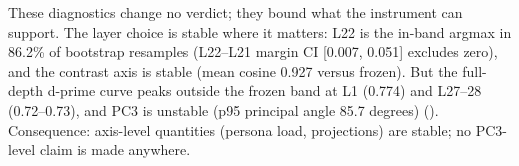 These diagnostics change no verdict; they bound what the instrument can
support. The layer choice is stable where it matters: L22 is the in-band
argmax in 86.2\% of bootstrap resamples (L22--L21 margin CI [0.007,
0.051] excludes zero), and the contrast axis is stable (mean cosine 0.927
versus frozen). But the full-depth d-prime curve peaks outside the frozen
band at L1 (0.774) and L27--28 (0.72--0.73), and PC3 is unstable (p95
principal angle 85.7 degrees) (). Consequence: axis-level
quantities (persona load, projections) are stable; no PC3-level claim is
made anywhere.
